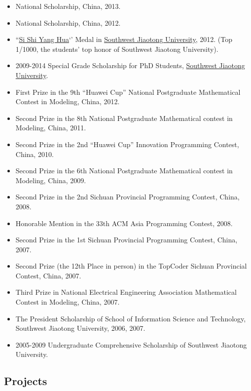 \documentclass[]{article}
\begin{document}
\begin{itemize}
\itemsep1pt\parskip0pt
\item
  National Scholarship, China, 2013.
\item
  National Scholarship, China, 2012.
\item
  ``\href{http://baike.baidu.com/view/644025.htm}{Si Shi Yang Hua}`'
  Medal in \href{http://www.swjtu.edu.cn/}{Southwest Jiaotong
  University}, 2012. (Top 1/1000, the students' top honor of Southwest
  Jiaotong University).
\item
  2009-2014 Special Grade Scholarship for PhD Students,
  \href{http://www.swjtu.edu.cn/}{Southwest Jiaotong University}.
\item
  First Prize in the 9th ``Huawei Cup'' National Postgraduate
  Mathematical Contest in Modeling, China, 2012.
\item
  Second Prize in the 8th National Postgraduate Mathematical contest in
  Modeling, China, 2011.
\item
  Second Prize in the 2nd ``Huawei Cup'' Innovation Programming Contest,
  China, 2010.
\item
  Second Prize in the 6th National Postgraduate Mathematical contest in
  Modeling, China, 2009.
\item
  Second Prize in the 2nd Sichuan Provincial Programming Contest, China,
  2008.
\item
  Honorable Mention in the 33th ACM Asia Programming Contest, 2008.
\item
  Second Prize in the 1st Sichuan Provincial Programming Contest, China,
  2007.
\item
  Second Prize (the 12th Place in person) in the TopCoder Sichuan
  Provincial Contest, China, 2007.
\item
  Third Prize in National Electrical Engineering Association
  Mathematical Contest in Modeling, China, 2007.\\
\item
  The President Scholarship of School of Information Science and
  Technology, Southwest Jiaotong University, 2006, 2007.\\
\item
  2005-2009 Undergraduate Comprehensive Scholarship of Southwest
  Jiaotong University.
\end{itemize}

\subsection{Projects}\label{projects}
\end{document}

